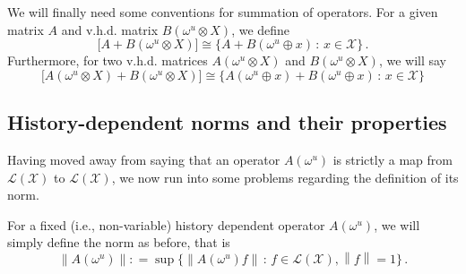 \documentclass[a4paper,reqno]{amsart}
\newcommand{\states}{\mathcal{X}}
\newcommand{\gambles}{\mathcal{L}}
\newcommand{\gamblesX}{\gambles(\states)}
\newcommand{\norm}[1]{\left\lVert #1 \right\rVert}
\newcommand{\coloneqq}{:\!=}
\begin{document}
We will finally need some conventions for summation of operators. For a given matrix $A$ and v.h.d. matrix $B(\omega^u\otimes X)$, we define
\begin{equation*}
\bigl[A + B(\omega^u\otimes X)\bigr] \cong \bigl\{A + B(\omega^u\oplus x)\,:\,x\in\states\bigr\}\,.
\end{equation*}
Furthermore, for two v.h.d. matrices $A(\omega^u\otimes X)$ and $B(\omega^u\otimes X)$, we will say
\begin{equation*}
\bigl[A(\omega^u\otimes X) + B(\omega^u\otimes X)\bigr] \cong \bigl\{A(\omega^u\oplus x) + B(\omega^u\oplus x)\,:\,x\in\states\bigr\}
\end{equation*}

\subsection{History-dependent norms and their properties} 

Having moved away from saying that an operator $A(\omega^u)$ is strictly a map from $\gamblesX$ to $\gamblesX$, we now run into some problems regarding the definition of its norm.

For a fixed (i.e., non-variable) history dependent operator $A(\omega^u)$, we will simply define the norm as before, that is
\begin{equation*}
\norm{A(\omega^u)} \coloneqq \sup\{\norm{A(\omega^u)f}\,:\,f\in\gamblesX, \norm{f}=1\}\,.
\end{equation*}
\end{document}

